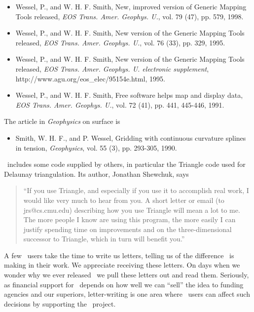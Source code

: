 \begin{itemize}

\item{Wessel, P., and W. H. F. Smith, New, improved version of Generic
Mapping Tools released, {\it EOS Trans. Amer. Geophys. U.}, vol. 79
(47), pp. 579, 1998.}

\item{Wessel, P., and W. H. F. Smith, New version of the Generic
Mapping Tools released, {\it EOS Trans. Amer. Geophys. U.}, vol. 76
(33), pp. 329, 1995.}

\item{Wessel, P., and W. H. F. Smith, New version of the Generic
Mapping Tools released, {\it EOS Trans. Amer. Geophys. U. electronic
supplement}, 
{http://www.agu.org/eos\_elec/95154e.html}, 1995.}

\item{Wessel, P., and W. H. F. Smith, Free software helps map and
display data, {\it EOS Trans. Amer. Geophys. U.}, vol. 72 (41),
pp. 441, 445-446, 1991.}

\end{itemize}

The article in {\it Geophysics} on surface is
%
%
\begin{itemize}

\item{Smith, W. H. F., and P. Wessel, Gridding with continuous
curvature splines in tension, {\it Geophysics}, vol. 55 (3), pp.
293-305, 1990.}

\end{itemize}

\GMT\ includes some code supplied by others, in particular the Triangle code
used for Delaunay triangulation.  Its author, Jonathan Shewchuk, says
\begin{quote}
``If you use Triangle, and especially if you use it to accomplish real
work, I would like very much to hear from you.  A short letter or email
(to jrs@cs.cmu.edu) describing how you use Triangle will mean a lot to
me.  The more people I know are using this program, the more easily I can
justify spending time on improvements and on the three-dimensional
successor to Triangle, which in turn will benefit you.''
\end{quote}

A few \GMT\ users take the time to write us letters, telling us of the
difference \GMT\ is making in their work.  We appreciate receiving these
letters.  On days when we wonder why we ever released \GMT\ we pull
these letters out and read them.  Seriously, as financial support for
\GMT\ depends on how well we can ``sell'' the idea to funding agencies and
our superiors, letter-writing is one area where \GMT\ users can affect
such decisions by supporting the \GMT\ project. 

